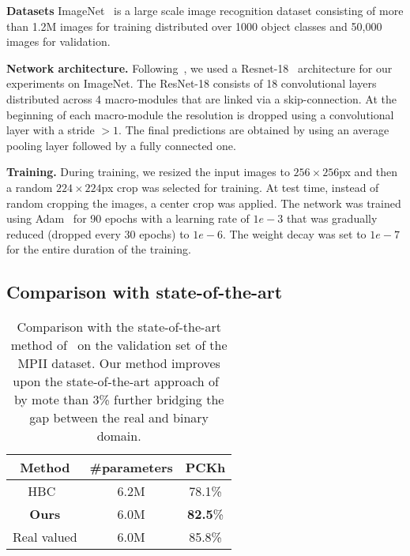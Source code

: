 \documentclass[10pt,twocolumn,letterpaper]{article}
\begin{document}
\textbf{Datasets} ImageNet~\cite{deng2009imagenet} is a large scale image recognition dataset consisting of more than 1.2M images for training distributed over 1000 object classes and 50,000 images for validation.

\noindent\textbf{Network architecture.} Following~\cite{rastegari2016xnor,courbariaux2015binaryconnect}, we used a Resnet-18~\cite{he2016deep} architecture for our experiments on ImageNet. The ResNet-18 consists of 18 convolutional layers distributed across 4 macro-modules that are linked via a skip-connection. At the beginning of each macro-module the resolution is dropped using a convolutional layer with a stride $>1$. The final predictions are obtained by using an average pooling layer followed by a fully connected one.

\noindent\textbf{Training.} During training, we resized the input images to $256\times 256$px and then a random $224\times224$px crop was selected for training. At test time, instead of random cropping the images, a center crop was applied. The network was trained using Adam~\cite{kingma2014adam} for 90 epochs with a learning rate of $1e-3$ that was gradually reduced (dropped every 30 epochs) to $1e-6$. The weight decay was set to $1e-7$ for the entire duration of the training.

\subsection{Comparison with state-of-the-art}\label{ssec:sota}

\begin{table}[!htbp]
	\begin{center}
    \small{
		\begin{tabular}{|c|c|c|}
			\hline
			Method & \#parameters & PCKh \\
			\hline\hline
			HBC~\cite{bulat2017binarized} & 6.2M  & 78.1\% \\
			\hline
			\textbf{Ours} &  6.0M  & \textbf{82.5}\% \\
			\hline
			Real valued & 6.0M & 85.8\% \\
			\hline
		\end{tabular}
		}
	\end{center}
	\caption{Comparison with the state-of-the-art method of~\cite{bulat2017binarized} on the validation set of the MPII dataset. Our method improves upon the state-of-the-art approach of~\cite{bulat2017binarized} by mote than 3\% further bridging the gap between the real and binary domain.}
	\label{tab:results-sota-mpii}
\end{table}
\end{document}
